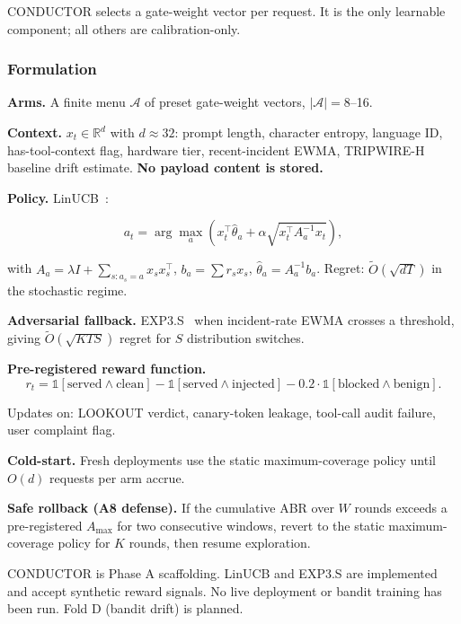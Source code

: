 \documentclass[11pt,a4paper]{article}
\begin{document}
CONDUCTOR selects a gate-weight vector per request.
It is the only learnable component; all others are calibration-only.

\subsubsection*{Formulation}

\textbf{Arms.} A finite menu $\mathcal{A}$ of preset gate-weight vectors, $|\mathcal{A}| = 8$--16.

\textbf{Context.} $x_t \in \mathbb{R}^d$ with $d \approx 32$: prompt length, character entropy,
language ID, has-tool-context flag, hardware tier, recent-incident EWMA, TRIPWIRE-H
baseline drift estimate.
\textbf{No payload content is stored.}

\textbf{Policy.} LinUCB~\citep{li2010contextual}:

\begin{equation}
  a_t = \arg\max_a \left( x_t^\top \hat\theta_a +
        \alpha \sqrt{x_t^\top A_a^{-1} x_t} \right),
  \label{eq:linucb}
\end{equation}

with $A_a = \lambda I + \sum_{s : a_s = a} x_s x_s^\top$,
$b_a = \sum r_s x_s$, $\hat\theta_a = A_a^{-1} b_a$.
Regret: $\tilde O(\sqrt{dT})$ in the stochastic regime.

\textbf{Adversarial fallback.} EXP3.S~\citep{auer2002exp3} when incident-rate EWMA
crosses a threshold, giving $\tilde O(\sqrt{KTS})$ regret for $S$ distribution
switches.

\textbf{Pre-registered reward function.}
\begin{equation}
  r_t = \mathbb{1}[\text{served} \land \text{clean}]
       - \mathbb{1}[\text{served} \land \text{injected}]
       - 0.2 \cdot \mathbb{1}[\text{blocked} \land \text{benign}].
  \label{eq:reward}
\end{equation}

Updates on: LOOKOUT verdict, canary-token leakage, tool-call audit failure,
user complaint flag.

\textbf{Cold-start.} Fresh deployments use the static maximum-coverage policy until
$O(d)$ requests per arm accrue.

\textbf{Safe rollback (A8 defense).}
If the cumulative ABR over $W$ rounds exceeds a pre-registered $A_\text{max}$ for
two consecutive windows, revert to the static maximum-coverage policy for $K$ rounds,
then resume exploration.

\begin{scaffoldbox}
CONDUCTOR is Phase A scaffolding. LinUCB and EXP3.S are implemented and accept
synthetic reward signals. No live deployment or bandit training has been run.
Fold D (bandit drift) is planned.
\end{scaffoldbox}
\end{document}
